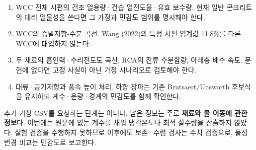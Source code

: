 \documentclass[11pt,a4paper]{article}
\begin{document}
\begin{enumerate}
\item WCC 전체 시편의 건조 열용량·건습 열전도율·유효 보수량. 현재 일반 콘크리트의 대리 열물성을 쓴다면 그 가정과 민감도 범위를 명시해야 한다.
\item WCC의 증발저항-수분 곡선. Wang (2022)의 특정 시편 임계값 11.8\%를 다른 WCC에 대입하지 않는다.
\item 두 재료의 흡인력·수리전도도 곡선, RCA의 잔류 수분함량, 아래층 배수 속도. 문헌에 없다면 고정 사실이 아닌 가정 시나리오로 검토해야 한다.
\item 대류·공기저항과 풍속 높이 처리. 하향 장파는 기존 Brutsaert/Unsworth 후보식을 유지하되 계수·운량·경계의 민감도를 함께 확인한다.
\end{enumerate}

추가 기상 CSV를 요청하는 단계는 아니다. 남은 정보는 주로 \textbf{재료와 물 이동에 관한 정보}다. 이번에는 원문에 없는 계수를 채워 냉각온도나 최적 살수량을 산출하지 않았다. 실험 검증을 수행하지 못하므로 이후에도 보존·수렴 검사는 수치 검증으로, 물성 변경 비교는 민감도로 보고한다.
\end{document}
